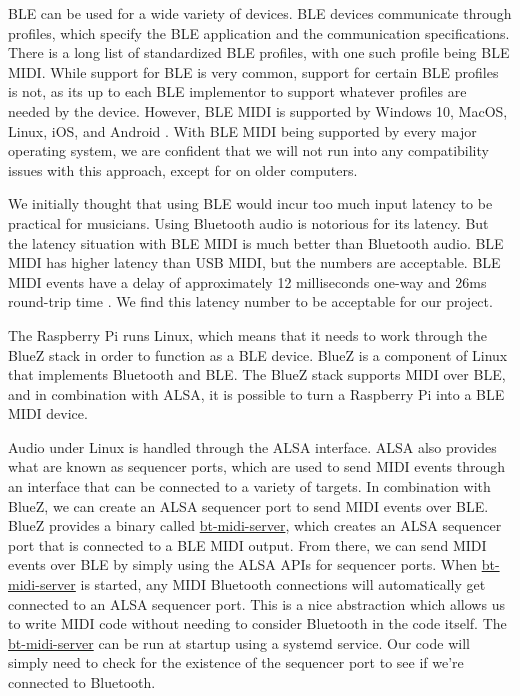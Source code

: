 BLE can be used for a wide variety of devices. BLE devices communicate through profiles,
which specify the BLE  application and the communication specifications. There is a long
list of standardized BLE profiles, with one such profile being BLE MIDI. While support for
BLE is very common, support for certain BLE profiles is not, as its up to each BLE
implementor to support whatever profiles are needed by the device. However, BLE MIDI is
supported by Windows 10, MacOS, Linux, iOS, and Android \autocite{ble-latency}. With BLE
MIDI being supported by every major operating system, we are confident that we will not
run into any compatibility issues with this approach, except for on older computers.

We initially thought that using BLE would incur too much input latency to be practical for
musicians. Using Bluetooth audio is notorious for its latency. But the latency situation
with BLE MIDI is much better than Bluetooth audio. BLE MIDI has higher latency than USB
MIDI, but the numbers are acceptable. BLE MIDI events have a delay of approximately 12
milliseconds one-way and 26ms round-trip time \autocite{ble-latency}. We find this
latency number to be acceptable for our project.

The Raspberry Pi runs Linux, which means that it needs to work through the BlueZ stack in
order to function as a BLE device. BlueZ is a component of Linux that implements Bluetooth
and BLE. The BlueZ stack supports MIDI over BLE, and in combination with ALSA, it is
possible to turn a Raspberry Pi into a BLE MIDI device.

Audio under Linux is handled through the ALSA interface. ALSA also provides what are known
as sequencer ports, which are used to send MIDI events through an interface that can be
connected to a variety of targets. In combination with BlueZ, we can create an ALSA
sequencer port to send MIDI events over BLE. BlueZ provides a binary called
\url{bt-midi-server}, which creates an ALSA sequencer port that is connected to a BLE MIDI
output. From there, we can send MIDI events over BLE by simply using the ALSA APIs for
sequencer ports. When \url{bt-midi-server} is started, any MIDI Bluetooth connections will
automatically get connected to an ALSA sequencer port. This is a nice abstraction which
allows us to write MIDI code without needing to consider Bluetooth in the code itself. The
\url{bt-midi-server} can be run at startup using a systemd service. Our code will simply
need to check for the existence of the sequencer port to see if we're connected to
Bluetooth.


